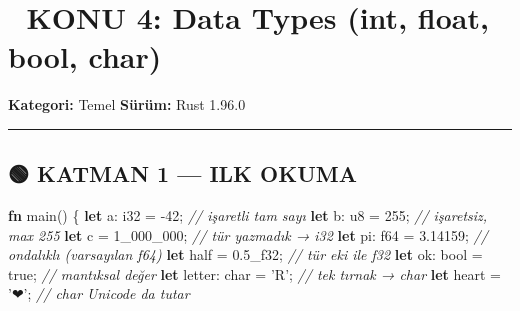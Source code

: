 \documentclass[12pt,a4paper]{article}
\newenvironment{Shaded}{}{}
\newcommand{\CharTok}[1]{\textcolor[rgb]{0.25,0.44,0.63}{#1}}
\newcommand{\CommentTok}[1]{\textcolor[rgb]{0.38,0.63,0.69}{\textit{#1}}}
\newcommand{\ConstantTok}[1]{\textcolor[rgb]{0.53,0.00,0.00}{#1}}
\newcommand{\DataTypeTok}[1]{\textcolor[rgb]{0.56,0.13,0.00}{#1}}
\newcommand{\DecValTok}[1]{\textcolor[rgb]{0.25,0.63,0.44}{#1}}
\newcommand{\FloatTok}[1]{\textcolor[rgb]{0.25,0.63,0.44}{#1}}
\newcommand{\FunctionTok}[1]{\textcolor[rgb]{0.02,0.16,0.49}{#1}}
\newcommand{\KeywordTok}[1]{\textcolor[rgb]{0.00,0.44,0.13}{\textbf{#1}}}
\newcommand{\NormalTok}[1]{#1}
\newcommand{\OperatorTok}[1]{\textcolor[rgb]{0.40,0.40,0.40}{#1}}
\begin{document}
\section{📘 KONU 4: Data Types (int, float, bool, char)}\label{konu-4-data-types-int-float-bool-char}

\textbf{Kategori:} Temel \textbar{} \textbf{Sürüm:} Rust 1.96.0

\begin{center}\rule{0.5\linewidth}{0.5pt}\end{center}

\subsection{🟢 KATMAN 1 --- ILK OKUMA}\label{katman-1-—-ilk-okuma-3}

\begin{Shaded}
\begin{Highlighting}[]
\KeywordTok{fn} \FunctionTok{main}\OperatorTok{()} \OperatorTok{\{}
    \KeywordTok{let}\NormalTok{ a}\OperatorTok{:} \DataTypeTok{i32} \OperatorTok{=} \OperatorTok{-}\DecValTok{42}\OperatorTok{;}           \CommentTok{// işaretli tam sayı}
    \KeywordTok{let}\NormalTok{ b}\OperatorTok{:} \DataTypeTok{u8} \OperatorTok{=} \DecValTok{255}\OperatorTok{;}            \CommentTok{// işaretsiz, max 255}
    \KeywordTok{let}\NormalTok{ c }\OperatorTok{=} \DecValTok{1\_}\DecValTok{000\_}\DecValTok{000}\OperatorTok{;}          \CommentTok{// tür yazmadık → i32}
    \KeywordTok{let}\NormalTok{ pi}\OperatorTok{:} \DataTypeTok{f64} \OperatorTok{=} \FloatTok{3.14159}\OperatorTok{;}      \CommentTok{// ondalıklı (varsayılan f64)}
    \KeywordTok{let}\NormalTok{ half }\OperatorTok{=} \FloatTok{0.5\_f}\DecValTok{32}\OperatorTok{;}         \CommentTok{// tür eki ile f32}
    \KeywordTok{let}\NormalTok{ ok}\OperatorTok{:} \DataTypeTok{bool} \OperatorTok{=} \ConstantTok{true}\OperatorTok{;}        \CommentTok{// mantıksal değer}
    \KeywordTok{let}\NormalTok{ letter}\OperatorTok{:} \DataTypeTok{char} \OperatorTok{=} \CharTok{'R'}\OperatorTok{;}     \CommentTok{// tek tırnak → char}
    \KeywordTok{let}\NormalTok{ heart }\OperatorTok{=} \CharTok{'❤'}\OperatorTok{;}            \CommentTok{// char Unicode da tutar}


\end{Highlighting}
\end{Shaded}
\end{document}
